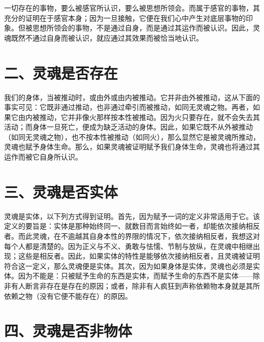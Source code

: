 一切存在的事物，要么被感官所认识，要么被思想所领会。而属于感官的事物，其充分的证明在于感官本身；因为一旦接触，它便在我们心中产生对底层事物的印象。但被思想所领会的事物，不是通过自身，而是通过其运作而被认识。因此，灵魂既然不通过自身而被认识，就应通过其效果而被恰当地认识。\par


\section{二、灵魂是否存在}

我们的身体，当被推动时，或由外或由内被推动。它并非由外被推动，这从下面的事实可见：它既非通过推动，也非通过牵引而被推动，如同无灵魂之物。再者，如果它由内被推动，它并非像火那样按本性被推动。因为火只要存在，就不会失去其活动；而身体一旦死亡，便成为缺乏活动的身体。因此，如果它既不从外被推动（如同无灵魂之物），也不按本性被推动（如同火），那么显然它是被灵魂所推动，灵魂也赋予身体生命。那么，如果灵魂被证明赋予我们身体生命，灵魂也将通过其运作而被它自身所认识。\par


\section{三、灵魂是否实体}

灵魂是实体，以下列方式得到证明。首先，因为赋予一词的定义非常适用于它。该定义的要旨是：实体是那种始终同一、就数目而言始终如一者，却能依次接纳相反者。而此灵魂，在不逾越其自身本性的界限的情况下，依次接纳相反者，我想这对每个人都是清楚的。因为正义与不义、勇敢与怯懦、节制与放纵，在灵魂中相继出现；这些是相反者。因此，如果实体的特性是能够依次接纳相反者，且灵魂被证明符合这一定义，那么灵魂便是实体。其次，因为如果身体是实体，灵魂也必须是实体。因为不能是：只被赋予生命的东西是实体，而赋予生命的东西不是实体——除非有人断言非存在是存在的原因；或者，除非有人疯狂到声称依赖物本身就是其所依赖之物（没有它便不能存在）的原因。\par


\section{四、灵魂是否非物体}

